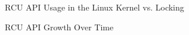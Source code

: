 \begin{figure}[bp]
\centering
{}
\caption{RCU API Usage in the Linux Kernel vs. Locking}
\label{fig:app:rcuhist:RCU API Usage in the Linux Kernel vs. Locking}
\end{figure}

\begin{figure}[tbp]
\centering
{}
\caption{RCU API Growth Over Time}
\label{fig:app:rcuhist:RCU API Growth Over Time}
\end{figure}

